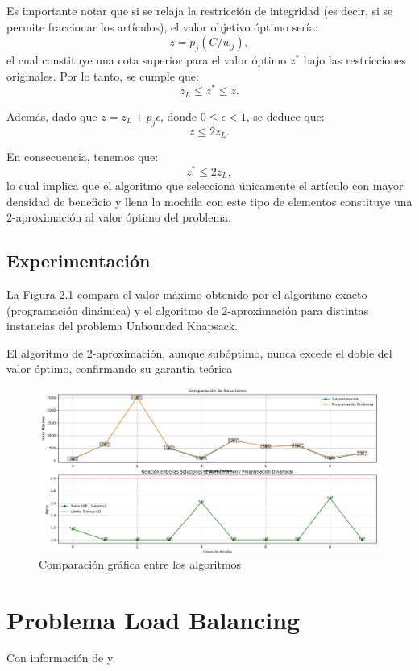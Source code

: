 \documentclass{report}
\begin{document}
Es importante notar que si se relaja la restricción de integridad (es decir, si se permite fraccionar los artículos), el valor objetivo óptimo sería:
\[
z = p_j (C / w_j),
\]
el cual constituye una cota superior para el valor óptimo $ z^* $ bajo las restricciones originales. Por lo tanto, se cumple que:
\[
z_L \leq z^* \leq z.
\]

Además, dado que $ z = z_L + p_j \epsilon $, donde $ 0 \leq \epsilon < 1 $, se deduce que:
\[
z \leq 2z_L.
\]

En consecuencia, tenemos que:
\[
z^* \leq 2z_L,
\]
lo cual implica que el algoritmo que selecciona únicamente el artículo con mayor densidad de beneficio y llena la mochila con este tipo de elementos constituye una $ 2 $-aproximación al valor óptimo del problema.

\section{Experimentación}
La Figura 2.1 compara el valor máximo obtenido por el algoritmo exacto (programación dinámica) y el algoritmo de 2-aproximación para distintas instancias del problema Unbounded Knapsack.

El algoritmo de 2-aproximación, aunque subóptimo, nunca excede el doble del valor óptimo, confirmando su garantía teórica

\begin{figure}[H]
	\centering
	\includegraphics[width=1\linewidth]{Figure_2}
	\caption{Comparación gráfica entre los algoritmos}
	\label{fig:figure1}
\end{figure}

	\chapter{Problema Load Balancing}
	
	{Con información de \cite{Kleinberg2005} y \cite{Garey1979}\\\\}
	
\end{document}

